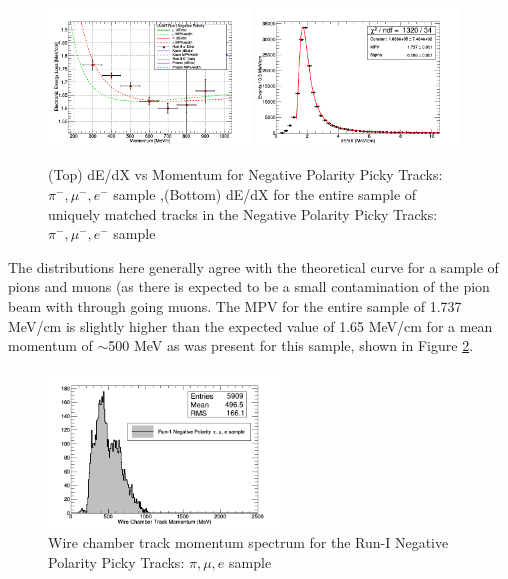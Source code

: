 \begin{figure}[htb]
\centering
\includegraphics[width=0.48\textwidth]{images/dEdXvsMomentumNegPolRun1FineBin2.png}
\includegraphics[width=0.48\textwidth]{images/dEdXRun1NegPolFinal.png}
\caption{(Top) dE/dX vs Momentum for Negative Polarity Picky Tracks: $\pi^{-}, \mu^{-}, e^{-}$ sample ,(Bottom) dE/dX for the entire sample of uniquely matched tracks in the Negative Polarity Picky Tracks: $\pi^{-}, \mu^{-}, e^{-}$ sample }
\label{fig:Run1NegPickyTrkPiMuEResults}
\end{figure}

The distributions here generally agree with the theoretical curve for a sample of pions and muons (as there is expected to be a small contamination of the pion beam with through going muons. The MPV for the entire sample of 1.737 MeV/cm is slightly higher than the expected value of 1.65 MeV/cm for a mean momentum of $\sim$500 MeV as was present for this sample, shown in Figure \ref{fig:Run1NegPickyTrkPiMuEMomentumSpec}.

\begin{figure}[htb]
\centering
\includegraphics[width=0.55\textwidth]{images/WCTrkMomentumRun1NegPiMuE.png}
\caption{Wire chamber track momentum spectrum for the Run-I Negative Polarity Picky Tracks: $\pi, \mu, e$ sample  }
\label{fig:Run1NegPickyTrkPiMuEMomentumSpec}
\end{figure}

